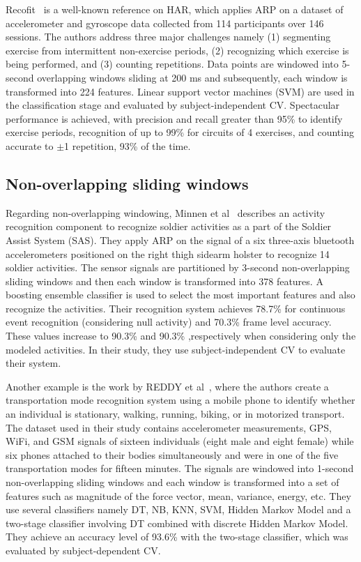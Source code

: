 Recofit~\cite{morris2014recofit} is a well-known reference on HAR, which applies ARP on a dataset of accelerometer and gyroscope data collected from 114 participants over 146 sessions. The authors address three major challenges namely (1) 
segmenting exercise from intermittent non-exercise periods, (2) 
recognizing which exercise is being performed, and (3) counting repetitions. Data points are windowed into 5-second overlapping windows sliding at 200 ms and subsequently, each window is transformed into 224 features. Linear support vector 
machines (SVM) are used in the classification stage and evaluated by 
subject-independent CV. Spectacular performance is achieved, with precision and 
recall greater than 95\% to identify exercise periods, recognition 
of up to 99\% for circuits of 4 exercises, and counting  
accurate to $\pm$1 repetition, 93\% of the time.


\subsection{Non-overlapping sliding windows}
Regarding non-overlapping windowing, Minnen et al~\cite{minnen2007recognizing} describes an activity recognition component to recognize soldier activities as a part of the Soldier Assist System (SAS). They apply ARP on the signal of a six three-axis bluetooth accelerometers
positioned on the right thigh sidearm holster to recognize 14 soldier activities. The sensor signals are partitioned by 3-second non-overlapping sliding windows and then each window is transformed into 378 features. A boosting ensemble classifier is used to select the most important features and also recognize the activities. Their recognition system achieves 78.7\% for continuous event recognition (considering null activity)
and 70.3\% frame level accuracy. These values increase to
90.3\% and 90.3\% ,respectively when considering only the
modeled activities. In their study, they use subject-independent CV to evaluate their system. 

Another example is the work by REDDY et al~\cite{reddy2010using}, where the authors create a transportation mode recognition system using a mobile phone to identify whether
an individual is stationary, walking, running, biking, or in motorized transport. The dataset used in their study contains accelerometer measurements, GPS, WiFi, and GSM signals of sixteen individuals (eight male and eight female) while six phones attached to their bodies simultaneously and were in one of the five transportation modes for fifteen minutes. The signals are windowed into 1-second non-overlapping sliding windows and each window is transformed into a set of features such as magnitude of the force vector, mean, variance, energy, etc. They use several classifiers namely DT, NB, KNN, SVM, Hidden Markov
Model and a two-stage classifier involving DT combined with discrete
Hidden Markov Model. They achieve an accuracy level of 93.6\% with the two-stage classifier, which was evaluated by subject-dependent CV.

